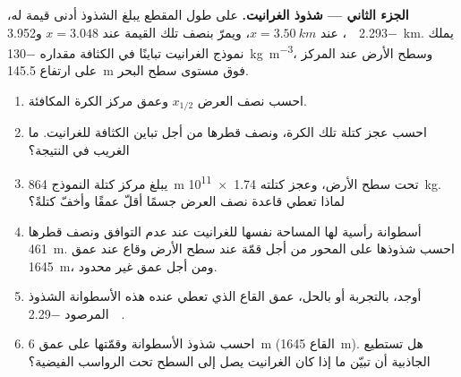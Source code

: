 \begin{problem}
\medskip\noindent\textbf{الجزء الثاني --- شذوذ الغرانيت.} على طول
المقطع يبلغ الشذوذ أدنى قيمة له، \qty{-2.293}{\milli\gal}، عند
$x = \qty{3.50}{km}$، ويمرّ بنصف تلك القيمة عند $x = 3.048$
و\qty{3.952}{km}. يملك نموذج الغرانيت تباينًا في الكثافة مقداره
\qty{-130}{kg.m^{-3}}، وسطح الأرض عند المركز على ارتفاع \qty{145.5}{m}
فوق مستوى سطح البحر.
\begin{enumerate}[resume]
\item احسب نصف العرض $x_{1/2}$ وعمق مركز
  الكرة المكافئة.
\item احسب عجز كتلة تلك الكرة، ونصف قطرها من أجل
  تباين الكثافة للغرانيت. ما الغريب في النتيجة؟
\item يبلغ مركز كتلة النموذج \qty{864}{m} تحت سطح الأرض، وعجز كتلته
  \qty{1.74e11}{kg}. لماذا تعطي قاعدة نصف العرض جسمًا
  أقلّ عمقًا وأخفّ كتلةً؟
\item أسطوانة رأسية لها المساحة نفسها للغرانيت عند
  عدم التوافق ونصف قطرها \qty{461}{m}. احسب شذوذها على المحور
  من أجل قمّة عند سطح الأرض وقاع عند عمق \qty{1645}{m}، ومن أجل
  عمق غير محدود.
\item أوجد، بالتجربة أو بالحل، عمق القاع الذي تعطي عنده هذه
  الأسطوانة الشذوذ المرصود \qty{-2.29}{\milli\gal}.
\item احسب شذوذ الأسطوانة وقمّتها على عمق \qty{6}{m}
  (القاع \qty{1645}{m}). هل تستطيع الجاذبية أن تبيّن ما إذا كان الغرانيت يصل
  إلى السطح تحت الرواسب الفيضية؟
\end{enumerate}


\end{problem}
